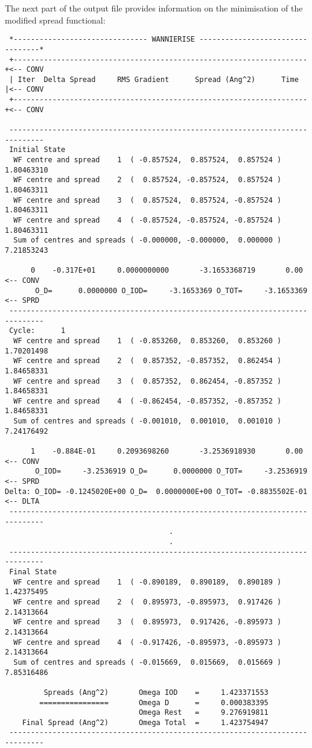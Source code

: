 The next part of the output file provides information on the minimisation of the 
modified spread functional:
\begin{verbatim}
 *------------------------------- WANNIERISE ---------------------------------*
 +--------------------------------------------------------------------+<-- CONV
 | Iter  Delta Spread     RMS Gradient      Spread (Ang^2)      Time  |<-- CONV
 +--------------------------------------------------------------------+<-- CONV

 ------------------------------------------------------------------------------
 Initial State
  WF centre and spread    1  ( -0.857524,  0.857524,  0.857524 )     1.80463310
  WF centre and spread    2  (  0.857524, -0.857524,  0.857524 )     1.80463311
  WF centre and spread    3  (  0.857524,  0.857524, -0.857524 )     1.80463311
  WF centre and spread    4  ( -0.857524, -0.857524, -0.857524 )     1.80463311
  Sum of centres and spreads ( -0.000000, -0.000000,  0.000000 )     7.21853243

      0    -0.317E+01     0.0000000000       -3.1653368719       0.00  <-- CONV
       O_D=      0.0000000 O_IOD=     -3.1653369 O_TOT=     -3.1653369 <-- SPRD
 ------------------------------------------------------------------------------
 Cycle:      1
  WF centre and spread    1  ( -0.853260,  0.853260,  0.853260 )     1.70201498
  WF centre and spread    2  (  0.857352, -0.857352,  0.862454 )     1.84658331
  WF centre and spread    3  (  0.857352,  0.862454, -0.857352 )     1.84658331
  WF centre and spread    4  ( -0.862454, -0.857352, -0.857352 )     1.84658331
  Sum of centres and spreads ( -0.001010,  0.001010,  0.001010 )     7.24176492

      1    -0.884E-01     0.2093698260       -3.2536918930       0.00  <-- CONV
       O_IOD=     -3.2536919 O_D=      0.0000000 O_TOT=     -3.2536919 <-- SPRD
Delta: O_IOD= -0.1245020E+00 O_D=  0.0000000E+00 O_TOT= -0.8835502E-01 <-- DLTA
 ------------------------------------------------------------------------------
                                      .
                                      .
 ------------------------------------------------------------------------------
 Final State
  WF centre and spread    1  ( -0.890189,  0.890189,  0.890189 )     1.42375495
  WF centre and spread    2  (  0.895973, -0.895973,  0.917426 )     2.14313664
  WF centre and spread    3  (  0.895973,  0.917426, -0.895973 )     2.14313664
  WF centre and spread    4  ( -0.917426, -0.895973, -0.895973 )     2.14313664
  Sum of centres and spreads ( -0.015669,  0.015669,  0.015669 )     7.85316486
 
         Spreads (Ang^2)       Omega IOD    =     1.423371553
        ================       Omega D      =     0.000383395
                               Omega Rest   =     9.276919811
    Final Spread (Ang^2)       Omega Total  =     1.423754947
 ------------------------------------------------------------------------------

\end{verbatim}
 
